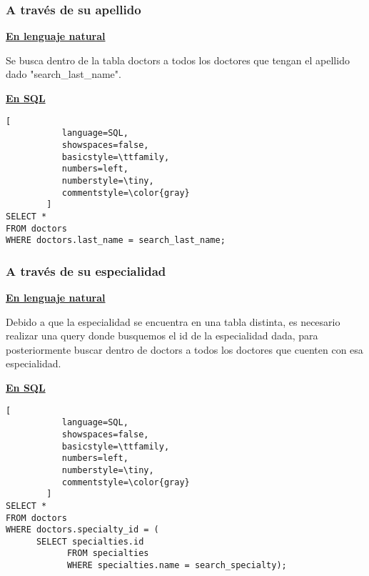 \subsubsection{A través de su apellido}

\textbf{\underline{En lenguaje natural}}

\vspace{0.3 cm}

Se busca dentro de la tabla doctors a todos los doctores que tengan el apellido dado "search_last_name".

\vspace{0.3 cm}

\textbf{\underline{En SQL}}

\vspace{0.3 cm}

\begin{lstlisting}[
           language=SQL,
           showspaces=false,
           basicstyle=\ttfamily,
           numbers=left,
           numberstyle=\tiny,
           commentstyle=\color{gray}
        ]
SELECT * 
FROM doctors
WHERE doctors.last_name = search_last_name;
\end{lstlisting}

\subsubsection{A través de su especialidad}

\textbf{\underline{En lenguaje natural}}

\vspace{0.3 cm}

Debido a que la especialidad se encuentra en una tabla distinta, es necesario realizar una query donde busquemos el id de la especialidad dada, para posteriormente buscar dentro de doctors a todos los doctores que cuenten con esa especialidad.

\vspace{0.3 cm}

\textbf{\underline{En SQL}}

\vspace{0.3 cm}

\begin{lstlisting}[
           language=SQL,
           showspaces=false,
           basicstyle=\ttfamily,
           numbers=left,
           numberstyle=\tiny,
           commentstyle=\color{gray}
        ]
SELECT * 
FROM doctors 
WHERE doctors.specialty_id = (
      SELECT specialties.id
            FROM specialties
            WHERE specialties.name = search_specialty);
\end{lstlisting}

